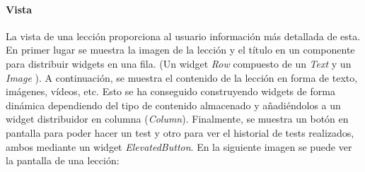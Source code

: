 \paragraph*{Vista}
La vista de una lección proporciona al usuario información más detallada de esta. En primer lugar se muestra la imagen de la lección y el título 
en un componente para distribuir widgets en una fila. (Un widget \textit{Row} compuesto de un \textit{Text} y un \textit{Image} ).
A continuación, se muestra el contenido de la lección en forma de texto, imágenes, vídeos, etc. Esto se ha conseguido construyendo 
widgets de forma dinámica dependiendo del tipo de contenido almacenado y añadiéndolos a un widget distribuidor en columna (\textit{Column}).
Finalmente, se muestra un botón en pantalla para poder hacer un test y otro para ver el historial de tests realizados, ambos mediante un widget \textit{ElevatedButton}.
En la siguiente imagen se puede ver la pantalla de una lección:

